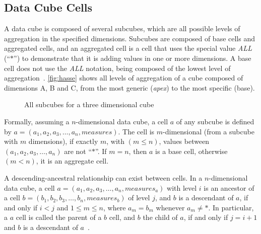 \subsection{Data Cube Cells}\label{ch:fun:cube:cells}

A data cube is composed of several subcubes, which are all possible levels of aggregation in the specified dimensions.
Subcubes are composed of base cells and aggregated cells, and an aggregated cell is a cell that uses the special value \textit{ALL} (``$*$'') to demonstrate that it is adding values in one or more dimensions.
A base cell does not use the \textit{ALL} notation, being composed of the lowest level of aggregation~\cite{limaSEQUENTIALPARALLELAPPROACHES2009}.
\autoref{fig:hasse} shows all levels of aggregation of a cube composed of dimensions A, B and C, from the most generic (\textit{apex}) to the most specific (base).

\begin{figure}[!htb]
  \caption{All subcubes for a three dimensional cube}\label{fig:hasse}
  \vspace{2mm}
  \begin{center}
  \end{center}
  \vspace{1mm}
\end{figure}

Formally, assuming a $n$-dimensional data cube, a cell $a$ of any subcube is defined by $a = (a_1, a_2, a_3, \ldots, a_n, measures)$.
The cell is $m$-dimensional (from a subcube with $m$ dimensions), if exactly $m$, with $(m \leq n)$, values between $(a_1, a_2, a_3, \ldots, a_n)$ are not ``$*$''.
If $m = n$, then $a$ is a base cell, otherwise $(m < n)$, it is an aggregate cell.

A descending-ancestral relationship can exist between cells.
In a $n$-dimensional data cube, a cell $a = (a_1, a_2, a_3, \ldots, a_n, measures_a)$ with level $i$ is an ancestor of a cell $b = (b_1, b_2, b_3, \ldots, b_n, measures_b)$ of level $j$, and $b$ is a descendant of $a$, if and only if $i < j$ and $1 \leq m \leq n$, where $a_m = b_m$ whenever $a_m \neq *$.
In particular, a $a$ cell is called the parent of a $b$ cell, and $b$ the child of $a$, if and only if $j = i+1$ and $b$ is a descendant of $a$~\cite{hanDataMiningConcepts2011}.

